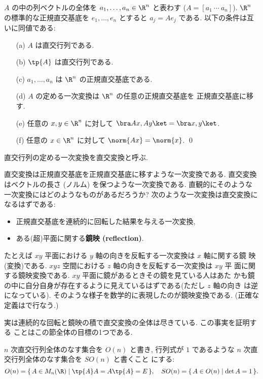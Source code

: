 \documentclass[12pt,twoside]{jarticle}
\begin{document}
\begin{question}
\label{q:orthogonal-matrices}
  $A$ の中の列ベクトルの全体を $a_1,\dots,a_n\in\R^n$ と表わす
  ($A=[a_1\ \cdots\ a_n]$).  
  $\R^n$ の標準的な正規直交基底を $e_1,\dots,e_n$ とすると $a_j=Ae_j$ である.
  以下の条件は互いに同値である:
  \begin{itemize}
  \item[(a)] $A$ は直交行列である.
  \item[(b)] $\tp{A}$ は直交行列である.
  \item[(c)] $a_1,\dots,a_n$ は $\R^n$ の正規直交基底である.
  \item[(d)] $A$ の定める一次変換は $\R^n$ の任意の正規直交基底を
    正規直交基底に移す.
  \item[(e)] 任意の $x,y\in\R^n$ に対して $\bra Ax,Ay\ket=\bra x,y\ket$.
  \item[(f)] 任意の $x\in\R^n$ に対して $\norm{Ax}=\norm{x}$.
    \qed
  \end{itemize}
\end{question}
直交行列の定める一次変換を直交変換と呼ぶ.  

直交変換は正規直交基底を正規直交基底に移すような一次変換である.
直交変換はベクトルの長さ (ノルム) を保つような一次変換である.
直観的にそのような一次変換にはどのようなものがあるだろうか?
次のような一次変換は直交変換になるはずである:
\begin{itemize}
\item 正規直交基底を連続的に回転した結果を与える一次変換,
\item ある(超)平面に関する{\bf 鏡映 (reflection)}.
\end{itemize}
たとえば $xy$ 平面における $y$ 軸の向きを反転する一次変換は $x$ 軸に関する鏡
映(変換)である.  $xyz$ 空間における $z$ 軸の向きを反転する一次変換は $xy$ 平
面に関する鏡映変換である.  $xy$ 平面に鏡があるときその鏡を見ている人はあた
かも鏡の中に自分自身が存在するように見えているはずである(ただし $z$ 軸の向き
は逆になっている).  そのような様子を数学的に表現したのが鏡映変換である.  
(正確な定義はで行なう.)  

実は連続的な回転と鏡映の積で直交変換の全体は尽きている.  この事実を証明する
ことはこの節全体の目標の1つである.

\bigskip

$n$ 次直交行列全体のなす集合を $O(n)$ と書き,
行列式が $1$ であるような $n$ 次直交行列全体のなす集合を $SO(n)$ と書くこと
にする:
\begin{equation*}
  O(n)=\{\, A\in M_n(\R) \mid \tp{A}A=A\tp{A}=E \,\},
  \quad
  SO(n)=\{\, A\in O(n) \mid \det A = 1 \,\}.
\end{equation*}
\end{document}
